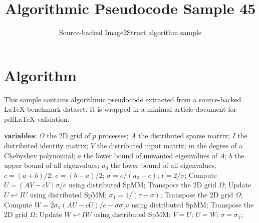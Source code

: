 \documentclass[11pt]{article}
\title{Algorithmic Pseudocode Sample 45}
\author{Source-backed Image2Struct algorithm sample}
\date{}
\begin{document}
\maketitle
\section{Algorithm}
This sample contains algorithmic pseudocode extracted from a source-backed LaTeX benchmark dataset. It is wrapped in a minimal article document for pdfLaTeX validation.

\begin{algorithm}[htbp]
\caption{Source-backed algorithmic procedure}
\begin{algorithm}
\caption{$[W] = DistributedChebyshevFilter(V, m, a, b, a_{0})$}
\begin{algorithmic}[1]
\State \textbf{variables}: $\Omega$ the 2D grid of $p$ processes; $A$ the distributed sparse matrix; $I$ the distributed identity matrix; $V$ the distributed input matrix; $m$ the degree of a Chebyshev polynomial; $a$ the lower bound of unwanted eigenvalues of $A$; $b$ the upper bound of all eigenvalues; $a_{0}$ the lower bound of all eigenvalues;
\State $c = (a + b) / 2$; $e = (b - a)/2$;
\State $\sigma = e/(a_{0}-c)$;
\State $t = 2/\sigma$;
\State Compute $U = (AV - cV)\sigma/e $ using distributed SpMM;
\State Transpose the 2D grid $\Omega$;
\State Update $U \hookleftarrow I U$ using distributed SpMM;
\State $\sigma_{1} = 1/(\tau - \sigma)$;
\State Transpose the 2D grid $\Omega$;
\State Compute $W = 2\sigma_{1}(A U - c U)/e - \sigma\sigma_{1}v$ using distributed SpMM;
\State Transpose the 2D grid $\Omega$;
\State Update $W \hookleftarrow I W$ using distributed SpMM;
\State $V = U$;
\State $U = W$;
\State $\sigma = \sigma_{1}$;
\EndFor
\end{algorithmic}
\end{algorithm}
\end{algorithm}
\end{document}
